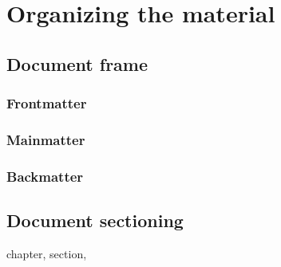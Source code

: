 \chapter{Organizing the material}

\section{Document frame}

\subsection{Frontmatter}

\subsection{Mainmatter}

\subsection{Backmatter}

\section{Document sectioning}

chapter, section, 
